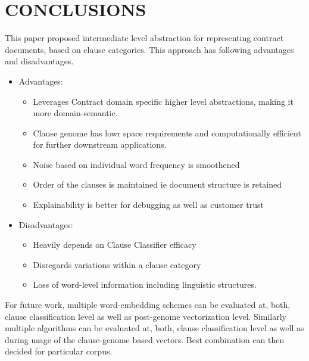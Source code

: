 \documentclass[9pt,academicons]{article}
\begin{document}


\section{CONCLUSIONS}

This paper proposed intermediate level abstraction for representing contract documents, based on clause categories. This approach has following advantages and disadvantages.

 \begin{itemize}
 \item Advantages:
  \begin{itemize}
\item Leverages Contract domain specific higher level abstractions, making it more domain-semantic.
\item Clause genome has lowr space requirements and computationally efficient for further downstream applications.
\item Noise based on individual word frequency is smoothened
\item Order of the clauses is maintained ie document structure is retained
\item Explainability is better for debugging as well as customer trust
\end{itemize}
\item Disadvantages:
 \begin{itemize}
\item Heavily depends on Clause Classifier efficacy
\item Disregards variations within a clause category
\item Loss of word-level information including linguistic structures.
\end{itemize}
\end{itemize}

For future work, multiple word-embedding schemes can be evaluated at, both, clause classification level as well as post-genome vectorization level. Similarly multiple algorithms can be evaluated at, both, clause classification level as well as during usage of the clause-genome based vectors. Best combination can then decided for particular corpus.
%








\bigskip
\end{document}
